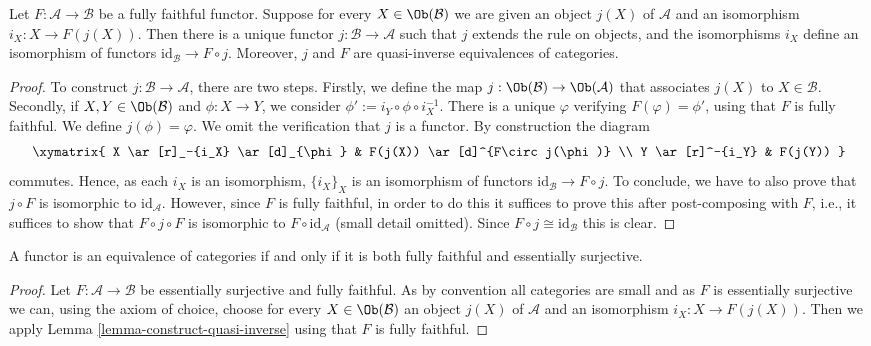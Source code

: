 \begin{lemma}
\label{lemma-construct-quasi-inverse}
Let $F : \mathcal{A} \to \mathcal{B}$ be a fully faithful functor.
Suppose for every $X \in \Ob(\mathcal{B})$ we are given an
object $j(X)$ of $\mathcal{A}$ and an isomorphism $i_X : X \to F(j(X))$.
Then there is a unique functor $j : \mathcal{B} \to \mathcal{A}$
such that $j$ extends the rule on objects, and the isomorphisms
$i_X$ define an isomorphism of functors
$\text{id}_\mathcal{B} \to F \circ j$. Moreover, $j$ and $F$
are quasi-inverse equivalences of categories.
\end{lemma}

\begin{proof}
To construct $j : \mathcal{B} \to \mathcal{A}$, there are two steps. Firstly,
we define the map $j : \Ob(\mathcal{B}) \to \Ob(\mathcal{A})$ that associates
$j(X)$ to $X \in \mathcal{B}$. Secondly, if $X,Y \in \Ob(\mathcal{B})$ and
$\phi : X \to Y$, we consider $\phi' := i_Y \circ\phi\circ i_X^{-1}$. There is
a unique $\varphi$ verifying $F(\varphi) = \phi'$, using that $F$ is fully
faithful. We define $j(\phi) = \varphi$. We omit the verification that $j$
is a functor. By construction the diagram
$$
\xymatrix{
X \ar[r]_-{i_X} \ar[d]_{\phi}
&
F(j(X)) \ar[d]^{F\circ j(\phi)}
\\
Y \ar[r]^-{i_Y}
&
F(j(Y))
}
$$
commutes. Hence, as each $i_X$ is an isomorphism, $\{i_X\}_X$ is an
isomorphism of functors $\text{id}_\mathcal{B} \to F\circ j$. To conclude, we
have to also prove that $j \circ F$ is isomorphic to $\text{id}_\mathcal{A}$.
However, since $F$ is fully faithful, in order to do this it suffices
to prove this after post-composing with $F$, i.e., it suffices to
show that $F \circ j \circ F$ is isomorphic to $F \circ \text{id}_\mathcal{A}$
(small detail omitted). Since $F \circ j \cong \text{id}_\mathcal{B}$
this is clear.
\end{proof}

\begin{lemma}
\label{lemma-equivalence-categories}
A functor is an equivalence of categories if and only if it is both fully
faithful and essentially surjective.
\end{lemma}

\begin{proof}
Let $F : \mathcal{A} \to \mathcal{B}$ be essentially surjective and fully
faithful. As by convention all categories are small and as $F$ is essentially
surjective we can, using the axiom of choice, choose for every
$X \in \Ob(\mathcal{B})$ an object $j(X)$ of $\mathcal{A}$ and an
isomorphism $i_X : X \to F(j(X))$. Then we apply
Lemma \ref{lemma-construct-quasi-inverse}
using that $F$ is fully faithful.
\end{proof}

